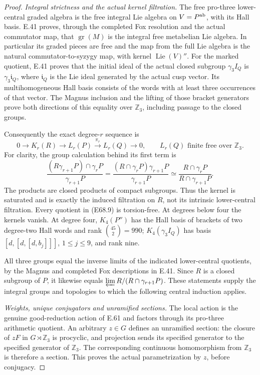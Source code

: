 \begin{proof}
\emph{Integral strictness and the actual kernel filtration.}
The free pro-three lower-central graded algebra is the
free integral Lie algebra on $V=P^{\rm ab}$, with its
Hall basis. E.41 proves, through the completed Fox
resolution and the actual commutator map, that
$\operatorname{gr}(M)$ is the integral free metabelian
Lie algebra. In particular its graded pieces are free
and the map from the full Lie algebra is the natural
commutator-to-syzygy map, with kernel $\operatorname{Lie}(V)''$.
For the marked quotient, E.41 proves that the initial
ideal of the actual closed subgroup $\gamma_3I_Q$ is
$\gamma_3\mathfrak i_Q$, where $\mathfrak i_Q$ is the
Lie ideal generated by the actual cusp vector. Its
multihomogeneous Hall basis consists of the words with
at least three occurrences of that vector. The Magnus
inclusion and the lifting of those bracket generators
prove both directions of this equality over
$\mathbb Z_3$, including passage to the closed groups.

Consequently the exact degree-$r$ sequence is
\[
 0\longrightarrow K_r(R)\longrightarrow L_r(P)
       \xrightarrow{\pi_r}L_r(Q)\longrightarrow0,
 \qquad L_r(Q)\text{ finite free over }\mathbb Z_3 .
 \tag{E68.9}
\]
For clarity, the group calculation behind its first term is
\[
 \frac{(R\gamma_{r+1}P)\cap\gamma_rP}{\gamma_{r+1}P}
 =\frac{(R\cap\gamma_rP)\gamma_{r+1}P}{\gamma_{r+1}P}
 \simeq\frac{R\cap\gamma_rP}{R\cap\gamma_{r+1}P}.
\]
The products are closed products of compact subgroups.
Thus the kernel is saturated and is exactly the induced
filtration on $R$, not its intrinsic lower-central
filtration. Every quotient in (E68.9) is torsion-free.
At degrees below four the kernels vanish. At degree four,
$K_4(P'')$ has the Hall basis of brackets of two
degree-two Hall words and rank $\binom{45}{2}=990$;
$K_4(\gamma_3I_Q)$ has basis
$[d,[d,[d,b_j]]]$, $1\le j\le9$, and rank nine.

All three groups equal the inverse limits of the indicated
lower-central quotients, by the Magnus and completed
Fox descriptions in E.41. Since $R$ is a closed subgroup
of $P$, it likewise equals
$\varprojlim R/(R\cap\gamma_{r+1}P)$.
These statements supply the integral groups and
topologies to which the following central induction applies.

\emph{Weights, unique conjugators and unramified sections.}
The local action is the genuine good-reduction action of
E.61 and factors through its pro-three arithmetic quotient.
An arbitrary $z\in G$ defines an unramified section:
the closure of $zF$ in $G\rtimes\mathbb Z_3$ is
procyclic, and projection sends its specified generator
to the specified generator of $\mathbb Z_3$.
The corresponding continuous homomorphism from
$\mathbb Z_3$ is therefore a section. This proves the
actual parametrization by $z$, before conjugacy.


\end{proof}
